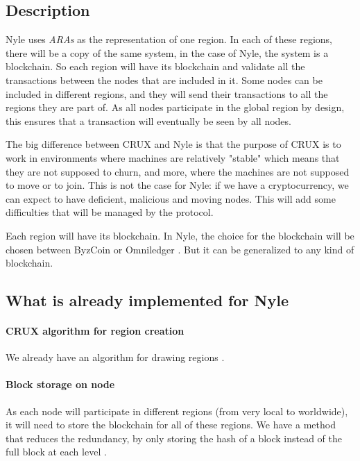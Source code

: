 \documentclass[a4paper,11pt,oneside]{report}
\begin{document}
\subsection{Description}

Nyle uses \textit{ARAs} as the representation of one region. In each of these
regions, there will be a copy of the same system, in the case of Nyle, the
system is a blockchain. So each region will have its blockchain and validate
all the transactions between the nodes that are included in it. Some nodes can
be included in different regions, and they will send their transactions to all
the regions they are part of. As all nodes participate in the global region by
design, this ensures that a transaction will eventually be seen by all nodes.

The big difference between CRUX \cite{Basescu2014} and Nyle is that the purpose
of CRUX \cite{Basescu2014} is to work in environments where machines are
relatively "stable" which means that they are not supposed to churn, and more,
where the machines are not supposed to move or to join. This is not the case
for Nyle: if we have a cryptocurrency, we can expect to have deficient,
malicious and moving nodes. This will add some difficulties that will be
managed by the protocol.

Each region will have its blockchain. In Nyle, the choice for the blockchain
will be chosen between ByzCoin \cite{Kogias2016} or Omniledger
\cite{Kokoris-Kogias2017}. But it can be generalized to any kind of blockchain.

\subsection{What is already implemented for Nyle} \paragraph{CRUX algorithm for
region creation} We already have an algorithm for drawing regions
\cite{Basescu2014}.

\paragraph{Block storage on node} As each node will participate in different
regions (from very local to worldwide), it will need to store the blockchain
for all of these regions. We have a method that reduces the redundancy, by only
storing the hash of a block instead of the full block at each level
\cite{Sierro2019}. 
\end{document}
